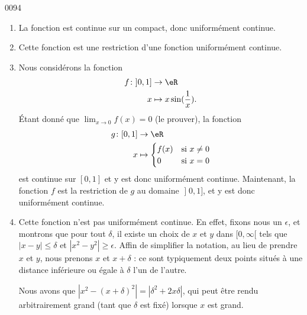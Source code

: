 
\begin{corrige}{0094}

\begin{enumerate}

\item
La fonction est continue sur un compact, donc uniformément continue.

\item
Cette fonction est une restriction d'une fonction uniformément continue.

\item
Nous considérons la fonction
\begin{equation}
	\begin{aligned}
		f\colon \mathopen]0,1\mathclose]&\to  \eR \\
		x&\mapsto x\sin(\frac{1}{ x }). 
	\end{aligned}
\end{equation}
Étant donné que $\lim_{x\to 0}f(x)=0$ (le prouver), la fonction
\begin{equation}
	\begin{aligned}
		g\colon \mathopen[0,1\mathclose]&\to  \eR \\
		x&\mapsto 
		\begin{cases}
			f(x) 	&	\text{si $x\neq 0$}\\
			0	&	 \text{si $x=0$}
\end{cases}
	\end{aligned}
\end{equation}
est continue sur $[0,1]$ et y est donc uniformément continue. Maintenant, la fonction $f$ est la restriction de $g$ au domaine $\mathopen]0,1\mathclose]$, et y est donc uniformément continue.

\item
Cette fonction n'est pas uniformément continue. En effet, fixons nous un $\epsilon$, et montrons que pour tout $\delta$, il existe un choix de $x$ et $y$ dans $\mathopen[0,\infty[$ tels que $| x-y |\leq\delta$ et $| x^2-y^2 |\geq \epsilon$. Affin de simplifier la notation, au lieu de prendre $x$ et $y$, nous prenons $x$ et $x+\delta$ : ce sont typiquement deux points situés à une distance inférieure ou égale à $\delta$ l'un de l'autre.

Nous avons que $| x^2-(x+\delta)^2 |=| \delta^2+2x\delta |$, qui peut être rendu arbitrairement grand (tant que $\delta$ est fixé) lorsque $x$ est grand.


\end{enumerate}
\end{corrige}
